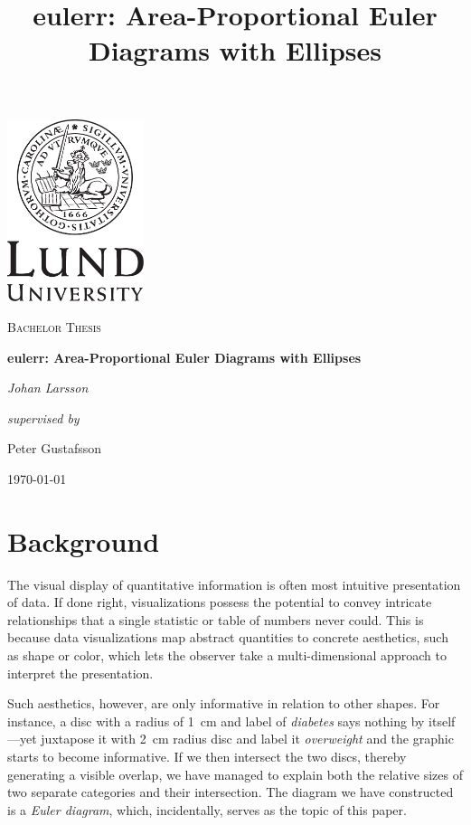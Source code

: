 \documentclass[
  a4paper,
  nofonts,
  nobib,
  titlepage,
  justified,
  marginals=raggedouter,
  nohyper
]{tufte-handout}\usepackage[]{graphicx}\usepackage[]{color}
\title{eulerr: Area-Proportional Euler Diagrams with Ellipses}
\begin{document}
\begin{titlepage}
\begin{fullwidth}
\centering
\vspace*{3cm}
\includegraphics[width=0.3\textwidth]{LundUniversity_C2line_BLACK}\par\vspace{1cm}
\vspace{0.5cm}
{\scshape\Large Bachelor Thesis \par}
{\Huge\bfseries eulerr: Area-Proportional Euler Diagrams with Ellipses\par}
\vspace{2cm}
{\huge\itshape Johan Larsson\par}
\vspace{2cm}
{\Large{\itshape supervised by}\par Peter Gustafsson}

\vfill

{\large \today\par}
 \end{fullwidth}%
\end{titlepage}

\section{Background}
The visual display of quantitative information is often most intuitive
presentation of data. If done right, visualizations possess
the  potential to convey intricate relationships that a single statistic or
table of numbers never could. This is because data visualizations
map abstract quantities to concrete aesthetics, such as shape or color,
which lets the observer take a multi-dimensional approach to interpret the
presentation.

Such aesthetics, however, are only informative in relation to other shapes.
For instance, a disc with a radius of 1~cm and label of \emph{diabetes} says
nothing by itself---yet juxtapose it with 2~cm radius disc and label it
\emph{overweight} and the graphic starts to become informative. If we then
intersect the two discs, thereby generating a visible overlap, we have
managed to explain both the relative sizes of two separate categories
and their intersection. The diagram we have constructed is a
\emph{Euler diagram}, which, incidentally, serves as the topic of this paper.
\end{document}
